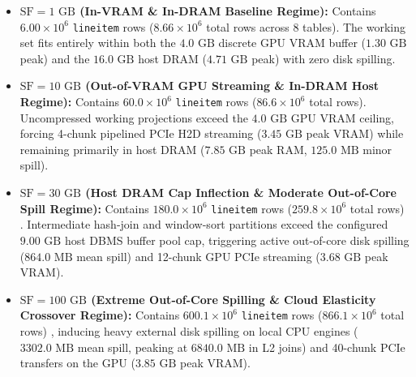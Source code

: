 \documentclass[10pt,a4paper]{article}
\begin{document}
\begin{itemize}[leftmargin=1.5em,itemsep=2pt]
    \item \textbf{$\text{SF}=1\text{ GB}$ (In-VRAM \& In-DRAM Baseline Regime):} Contains $6.00\times 10^6$ \texttt{lineitem} rows ($8.66\times 10^6$ total rows across 8 tables). The working set fits entirely within both the $4.0\text{ GB}$ discrete GPU VRAM buffer ($1.30\text{ GB}$ peak) and the $16.0\text{ GB}$ host DRAM ($4.71\text{ GB}$ peak) with zero disk spilling.
    \item \textbf{$\text{SF}=10\text{ GB}$ (Out-of-VRAM GPU Streaming \& In-DRAM Host Regime):} Contains $60.0\times 10^6$ \texttt{lineitem} rows ($86.6\times 10^6$ total rows). Uncompressed working projections exceed the $4.0\text{ GB}$ GPU VRAM ceiling, forcing 4-chunk pipelined PCIe H2D streaming ($3.45\text{ GB}$ peak VRAM) while remaining primarily in host DRAM ($7.85\text{ GB}$ peak RAM, $125.0\text{ MB}$ minor spill).
    \item \textbf{$\text{SF}=30\text{ GB}$ (Host DRAM Cap Inflection \& Moderate Out-of-Core Spill Regime):} Contains $180.0\times 10^6$ \texttt{lineitem} rows ($259.8\times 10^6$ total rows) \cite{tpc2022tpch}. Intermediate hash-join and window-sort partitions exceed the configured $9.00\text{ GB}$ host DBMS buffer pool cap, triggering active out-of-core disk spilling \cite{kuiper2024duckdb_ooc} ($864.0\text{ MB}$ mean spill) and 12-chunk GPU PCIe streaming ($3.68\text{ GB}$ peak VRAM).
    \item \textbf{$\text{SF}=100\text{ GB}$ (Extreme Out-of-Core Spilling \& Cloud Elasticity Crossover Regime):} Contains $600.1\times 10^6$ \texttt{lineitem} rows ($866.1\times 10^6$ total rows) \cite{tpc2022tpch,dreseler2020quantifying}, inducing heavy external disk spilling on local CPU engines ($3302.0\text{ MB}$ mean spill, peaking at $6840.0\text{ MB}$ in L2 joins) and 40-chunk PCIe transfers on the GPU ($3.85\text{ GB}$ peak VRAM).
\end{itemize}
\end{document}
